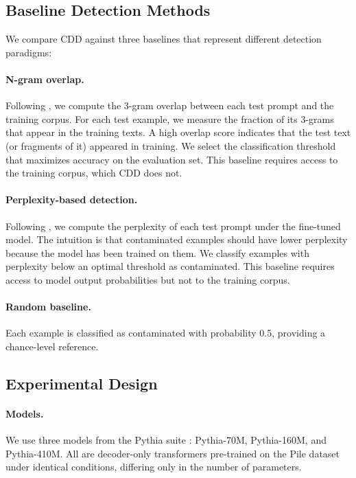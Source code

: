 \documentclass[11pt]{article}
\begin{document}
\subsection{Baseline Detection Methods}

We compare CDD against three baselines that represent different detection paradigms:

\paragraph{N-gram overlap.} Following \citet{brown2020language}, we compute the 3-gram overlap between each test prompt and the training corpus. For each test example, we measure the fraction of its 3-grams that appear in the training texts. A high overlap score indicates that the test text (or fragments of it) appeared in training. We select the classification threshold that maximizes accuracy on the evaluation set. This baseline requires access to the training corpus, which CDD does not.

\paragraph{Perplexity-based detection.} Following \citet{li2023estimating}, we compute the perplexity of each test prompt under the fine-tuned model. The intuition is that contaminated examples should have lower perplexity because the model has been trained on them. We classify examples with perplexity below an optimal threshold as contaminated. This baseline requires access to model output probabilities but not to the training corpus.

\paragraph{Random baseline.} Each example is classified as contaminated with probability 0.5, providing a chance-level reference.

\subsection{Experimental Design}

\paragraph{Models.} We use three models from the Pythia suite \citep{biderman2023pythia}: Pythia-70M, Pythia-160M, and Pythia-410M. All are decoder-only transformers pre-trained on the Pile dataset under identical conditions, differing only in the number of parameters.
\end{document}
